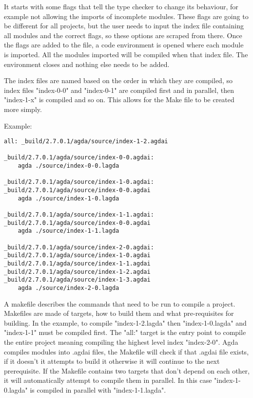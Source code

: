 It starts with some flags that tell the type checker to change its behaviour,
for example not allowing the imports of incomplete modules. These flags are
going to be different for all projects, but the user needs to input the index
file containing all modules and the correct flags, so these options are scraped
from there. Once the flags are added to the file, a code environment is opened
where each module is imported. All the modules imported will be compiled when
that index file. The environment closes and nothing else needs to be added.


The index files are named based on the order in which they are compiled, so
index files "index-0-0" and "index-0-1" are compiled first and in parallel,
then "index-1-x" is compiled and so on. This allows for the Make file to be
created more simply. 

Example:

\begin{lstlisting}
all: _build/2.7.0.1/agda/source/index-1-2.agdai 

_build/2.7.0.1/agda/source/index-0-0.agdai: 
	agda ./source/index-0-0.lagda

_build/2.7.0.1/agda/source/index-1-0.agdai: _build/2.7.0.1/agda/source/index-0-0.agdai 
	agda ./source/index-1-0.lagda

_build/2.7.0.1/agda/source/index-1-1.agdai: _build/2.7.0.1/agda/source/index-0-0.agdai 
	agda ./source/index-1-1.lagda

_build/2.7.0.1/agda/source/index-2-0.agdai: _build/2.7.0.1/agda/source/index-1-0.agdai _build/2.7.0.1/agda/source/index-1-1.agdai _build/2.7.0.1/agda/source/index-1-2.agdai _build/2.7.0.1/agda/source/index-1-3.agdai 
	agda ./source/index-2-0.lagda
\end{lstlisting}

A makefile describes the commands that need to be run to compile a project.
Makefiles are made of targets, how to build them and what pre-requisites for
building. In the example, to compile "index-1-2.lagda" then "index-1-0.lagda"
and "index-1-1" must be compiled first. The "all:" target is the entry point to
compile the entire project meaning compiling the highest level index
"index-2-0". Agda compiles modules into .agdai files, the Makefile will check
if that .agdai file exists, if it doesn't it attempts to build it otherwise it
will continue to the next prerequisite. If the Makefile contains two targets
that don't depend on each other, it will automatically attempt to compile them
in parallel. In this case "index-1-0.lagda" is compiled in parallel with
"index-1-1.lagda".

